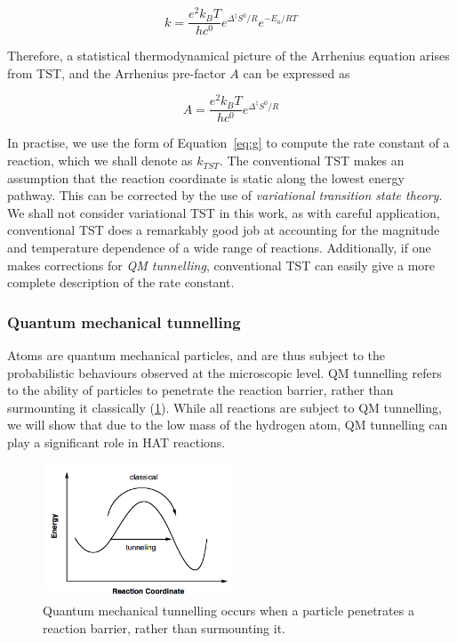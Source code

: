 \begin{equation}
  k = \frac{e^2k_B T}{hc^0}e^{\Delta^\ddagger S^0/R}e^{-E_a/RT}
\end{equation}

Therefore, a statistical thermodynamical picture of the Arrhenius equation
arises from TST, and the Arrhenius pre-factor $A$ can be expressed as

\begin{equation}
  A = \frac{e^2k_B T}{hc^0}e^{\Delta^\ddagger S^0/R}
\label{eq:afactor}
\end{equation}

In practise, we use the form of Equation~\ref{eq:g} to compute the rate
constant of a reaction, which we shall denote as $k_{TST}$. The conventional
TST makes an assumption that the reaction coordinate is static along the lowest
energy pathway. This can be corrected by the use of \emph{variational
transition state theory}.\cite{Truhlar1984} We shall not consider variational
TST in this work, as with careful application, conventional TST does a
remarkably good job at accounting for the magnitude and temperature dependence
of a wide range of reactions.\cite{Steinfeld1998} Additionally, if one makes
corrections for \emph{QM tunnelling}, conventional TST can easily give a more
complete description of the rate constant.

\subsubsection{Quantum mechanical tunnelling}

Atoms are quantum mechanical particles, and are thus subject to the
probabilistic behaviours observed at the microscopic level. QM tunnelling refers
to the ability of particles to penetrate the reaction barrier, rather than
surmounting it classically (\ref{fig:tunnelling}). While all reactions are
subject to QM tunnelling, we will show that due to the low mass of the hydrogen
atom, QM tunnelling can play a significant role in HAT reactions.

\begin{figure}[htb]
  \centering
  \includegraphics[width=0.5\textwidth]{figures/tunnelling-1}
  \caption{Quantum mechanical tunnelling occurs when a particle penetrates a
    reaction barrier, rather than surmounting it.}
\label{fig:tunnelling}
\end{figure}


